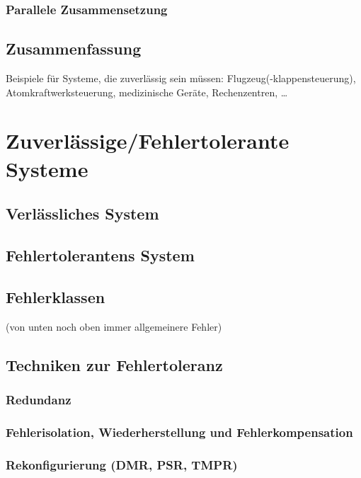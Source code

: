 \subsubsection{Parallele Zusammensetzung}

\subsection{Zusammenfassung}

Beispiele für Systeme, die zuverlässig sein müssen: Flugzeug(-klappensteuerung), Atomkraftwerksteuerung, medizinische Geräte, Rechenzentren, …

\section{Zuverlässige/Fehlertolerante Systeme}
\subsection{Verlässliches System}
\subsection{Fehlertolerantens System}
\subsection{Fehlerklassen}
(von unten noch oben immer allgemeinere Fehler)
\subsection{Techniken zur Fehlertoleranz}
\subsubsection{Redundanz}
\subsubsection{Fehlerisolation, Wiederherstellung und Fehlerkompensation}
\subsubsection{Rekonfigurierung (DMR, PSR, TMPR)}
